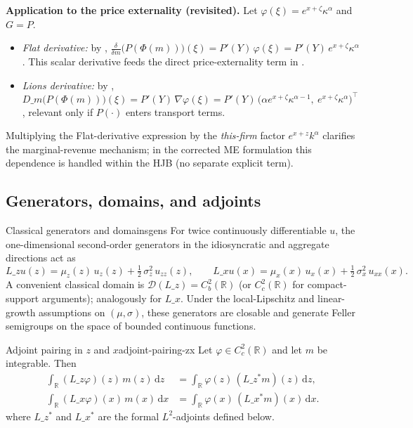 ﻿\documentclass[11pt,letterpaper,oneside]{article}
\numberwithin{equation}{section}
\newcommand{\R}{\mathbb{R}}
\newcommand{\1}{\mathbf{1}}
\newcommand{\Lz}{L\_z}
\newcommand{\Lx}{L\_x}
\newcommand{\Lzadj}{L\_z^{\!*}}
\newcommand{\Dm}{D\_m}
\begin{document}
\begin{tcolorbox}[mathstyle]
\textbf{Application to the price externality (revisited).} Let $\varphi(\xi)=e^{x+\zeta}\kappa^\alpha$ and $G=P$.
\begin{itemize}[leftmargin=1.15em,itemsep=0.25em]
  \item \emph{Flat derivative:} by , $\tfrac{\delta}{\delta m}\big(P(\Phi(m))\big)(\xi)=P'(Y)\,\varphi(\xi)=P'(Y)\,e^{x+\zeta}\kappa^\alpha$. This scalar derivative feeds the direct price-externality term in .
  \item \emph{Lions derivative:} by , $\Dm\big(P(\Phi(m))\big)(\xi)=P'(Y)\,\nabla\varphi(\xi)=P'(Y)\,\big(\alpha e^{x+\zeta}\kappa^{\alpha-1},\ e^{x+\zeta}\kappa^\alpha\big)^{\!\top}$, relevant only if $P(\cdot)$ enters transport terms.
\end{itemize}
Multiplying the Flat-derivative expression by the \emph{this-firm} factor $e^{x+z}k^\alpha$ clarifies the marginal-revenue mechanism; in the corrected ME formulation this dependence is handled within the HJB (no separate explicit term).
\end{tcolorbox}

\subsection{Generators, domains, and adjoints}\label{sec:generators}

\begin{definition}{Classical generators and domains}{gens}
For twice continuously differentiable $u$, the one-dimensional second-order generators in the idiosyncratic and aggregate directions act as
\[
\Lz u(z)=\mu_z(z)\,u_z(z)+\tfrac12\,\sigma_z^2\,u_{zz}(z),\qquad
\Lx u(x)=\mu_x(x)\,u_x(x)+\tfrac12\,\sigma_x^2\,u_{xx}(x).
\]
A convenient classical domain is $\mathcal D(\Lz)=C_b^2(\R)$ (or $C_c^2(\R)$ for compact-support arguments); analogously for $\Lx$. Under the local-Lipschitz and linear-growth assumptions on $(\mu,\sigma)$, these generators are closable and generate Feller semigroups on the space of bounded continuous functions.
\end{definition}

\begin{lemma}{Adjoint pairing in $z$ and $x$}{adjoint-pairing-zx}
Let $\varphi\in C_c^2(\R)$ and let $m$ be integrable. Then
\[
\begin{aligned}
\int_{\R} (\Lz \varphi)(z)\, m(z)\,\mathrm dz &= \int_{\R} \varphi(z)\, (\Lzadj m)(z)\,\mathrm dz, \\
\int_{\R} (\Lx \varphi)(x)\, m(x)\,\mathrm dx &= \int_{\R} \varphi(x)\, (\Lx^{\!*} m)(x)\,\mathrm dx.
\end{aligned}
\]
where $\Lzadj$ and $\Lx^{\!*}$ are the formal $L^2$-adjoints defined below.
\end{lemma}
\end{document}
